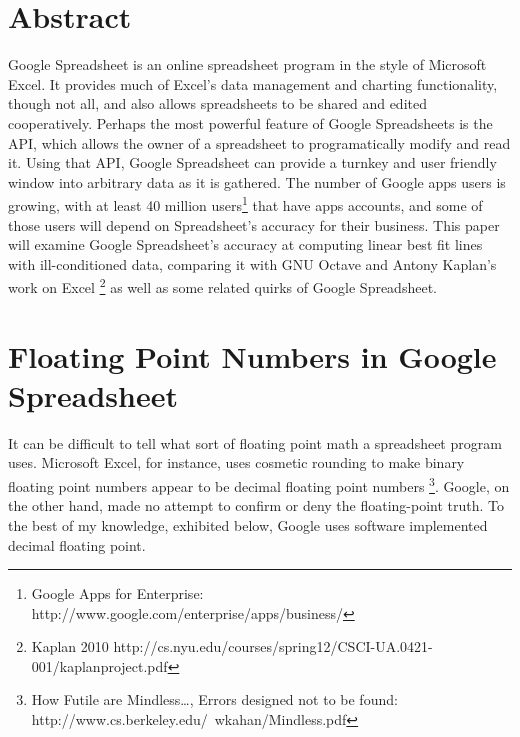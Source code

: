 \documentclass{article}
\title{\cTitle}
\author{\cAuthor}
\begin{document}
\maketitle

\section*{Abstract}
Google Spreadsheet is an online spreadsheet program in the style of Microsoft Excel.
It provides much of Excel's data management and charting functionality, though not all,
and also allows spreadsheets to be shared and edited cooperatively.
Perhaps the most powerful feature of Google Spreadsheets is the API,
which allows the owner of a spreadsheet to programatically modify and read it.
Using that API, Google Spreadsheet can provide a turnkey and user friendly window into
arbitrary data as it is gathered.  The number of Google apps users is growing,
with at least 40 million users\footnote{Google Apps for Enterprise: http://www.google.com/enterprise/apps/business/}
that have apps accounts, and some of those users
will depend on Spreadsheet's accuracy for their business.  This paper will examine
Google Spreadsheet's accuracy at computing linear best fit lines with ill-conditioned data,
comparing it with GNU Octave and Antony Kaplan's work on Excel
\footnote{Kaplan 2010 http://cs.nyu.edu/courses/spring12/CSCI-UA.0421-001/kaplanproject.pdf}
as well as some related quirks of Google Spreadsheet.
\newpage
\section*{Floating Point Numbers in Google Spreadsheet}
It can be difficult to tell what sort of floating point math a spreadsheet program uses.
Microsoft Excel, for instance, uses cosmetic rounding to make binary floating point numbers
appear to be decimal floating point numbers
\footnote{How Futile are Mindless\dots, Errors designed not to be found: http://www.cs.berkeley.edu/~wkahan/Mindless.pdf}.
Google, on the other hand, made no attempt to confirm or deny the floating-point truth.
To the best of my knowledge, exhibited below, Google uses software implemented decimal floating point.\\
\end{document}
